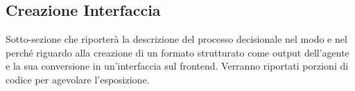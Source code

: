 \subsection{Creazione Interfaccia}

Sotto-sezione che riporterà la descrizione del processo decisionale nel modo e nel perché riguardo alla creazione di un formato strutturato come output dell'agente e la sua conversione in un'interfaccia sul frontend.
Verranno riportati porzioni di codice per agevolare l'esposizione.
